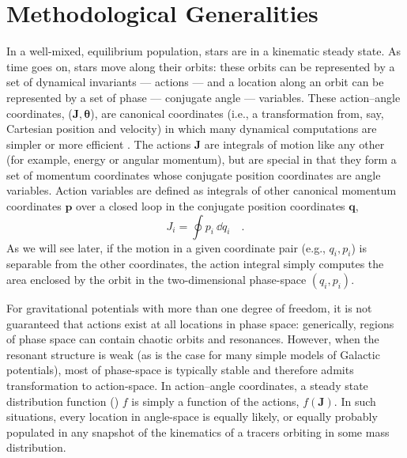 \documentclass[modern]{aastex63}
\begin{document}
\section{Methodological Generalities}
\label{sec:generalities}

In a well-mixed, equilibrium population, stars are in a kinematic steady state.
As time goes on, stars move along their orbits: these orbits can be represented
by a set of dynamical invariants --- actions --- and a location along an orbit
can be represented by a set of phase --- conjugate angle --- variables.
These action--angle coordinates, ($\boldsymbol{J}, \boldsymbol{\theta}$), are
canonical coordinates (i.e., a transformation from, say, Cartesian position and
velocity) in which many dynamical computations are simpler or more efficient
\citep[see, e.g.,][]{Binney:2008}.
The actions $\boldsymbol{J}$ are integrals of motion like any other (for
example, energy or angular momentum), but are special in that they form a set of
momentum coordinates whose conjugate position coordinates are angle variables.
Action variables are defined as integrals of other canonical momentum
coordinates $\boldsymbol{p}$ over a closed loop in the conjugate position
coordinates $\boldsymbol{q}$,
\begin{equation}
  J_i = \oint p_i~\dd q_i \quad .
\end{equation}
As we will see later, if the motion in a given coordinate pair (e.g., $q_i,
p_i$) is separable from the other coordinates, the action integral simply
computes the area enclosed by the orbit in the two-dimensional phase-space
$(q_i, p_i)$.

For gravitational potentials with more than one degree of freedom, it is not
guaranteed that actions exist at all locations in phase space: generically,
regions of phase space can contain chaotic orbits and resonances.
However, when the resonant structure is weak (as is the case for many simple
models of Galactic potentials), most of phase-space is typically stable and
therefore admits transformation to action-space.
In action--angle coordinates, a steady state distribution function
() $f$ is simply a function of the actions, $f(\boldsymbol{J})$.
In such situations, every location in angle-space is equally likely, or equally
probably populated in any snapshot of the kinematics of a tracers orbiting in
some mass distribution.
\end{document}
